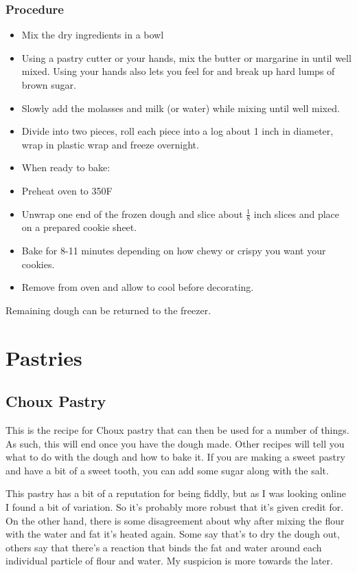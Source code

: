 \documentclass[10pt, openany]{book}
\begin{document}
\subsection{Procedure}
\begin{itemize}
  \item Mix the dry ingredients in a bowl
  \item Using a pastry cutter or your hands, mix the butter or margarine in until well mixed.  Using your hands also lets you feel for and break up hard lumps of brown sugar.
  \item Slowly add the molasses and milk (or water) while mixing until well mixed.
  \item Divide into two pieces, roll each piece into a log about 1 inch in diameter, wrap in plastic wrap and freeze overnight.
  \item When ready to bake:
  \item Preheat oven to 350\degree{}F
  \item Unwrap one end of the frozen dough and slice about $\frac{1}{8}$ inch slices and place on a prepared cookie sheet.
  \item Bake for 8-11 minutes depending on how chewy or crispy you want your cookies.
  \item Remove from oven and allow to cool before decorating.
\end{itemize}
Remaining dough can be returned to the freezer.
\chapter{Pastries}
\section{Choux Pastry}
\label{pastry:choux}
This is the recipe for Choux pastry that can then be used for a number of things.  As such, this will end once you have the dough made.  Other recipes will tell you what to do with the dough and how to bake it.  If you are making a sweet pastry and have a bit of a sweet tooth, you can add some sugar along with the salt.

This pastry has a bit of a reputation for being fiddly, but as I was looking online I found a bit of variation.  So it's probably more robust that it's given credit for.  On the other hand, there is some disagreement about why after mixing the flour with the water and fat it's heated again.  Some say that's to dry the dough out, others say that there's a reaction that binds the fat and water around each individual particle of flour and water.  My suspicion is more towards the later.
\end{document}
